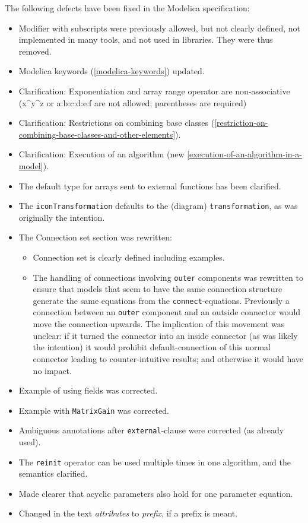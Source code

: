 The following defects have been fixed in the Modelica specification:
\begin{itemize}
\item
  Modifier with subscripts were previously allowed, but not clearly
  defined, not implemented in many tools, and not used in libraries.
  They were thus removed.
\item
  Modelica keywords (\cref{modelica-keywords}) updated.
\item
  Clarification: Exponentiation and array range operator are
  non-associative\\
  (x\^{}y\^{}z or a:b:c:d:e:f are not allowed; parentheses are required)
\item
  Clarification: Restrictions on combining base classes (\cref{restriction-on-combining-base-classes-and-other-elements}).
\item
  Clarification: Execution of an algorithm (new \cref{execution-of-an-algorithm-in-a-model}).
\item
  The default type for arrays sent to external functions has been
  clarified.
\item
  The \lstinline!iconTransformation! defaults to the (diagram)
  \lstinline!transformation!, as was originally the intention.
\item
  The Connection set section was rewritten:
  \begin{itemize}
  \item
    Connection set is clearly defined including examples.
  \item
    The handling of connections involving \lstinline!outer! components was rewritten to ensure that models that seem to have the same connection structure generate the same equations from the \lstinline!connect!-equations.
    Previously a connection between an \lstinline!outer! component and an outside connector would move the connection upwards.
    The implication of this movement was unclear: if it turned the connector into an inside connector (as was likely the intention) it would prohibit default-connection of this normal connector leading to counter-intuitive results; and otherwise it would have no impact.
  \end{itemize}
\item
  Example of using fields was corrected.
\item
  Example with \lstinline!MatrixGain! was corrected.
\item
  Ambiguous annotations after \lstinline!external!-clause were corrected (as already used).
\item
  The \lstinline!reinit! operator can be used multiple times in one algorithm, and the semantics clarified.
\item
  Made clearer that acyclic parameters also hold for one parameter
  equation.
\item
  Changed in the text \emph{attributes} to \emph{prefix}, if a prefix is
  meant.
\end{itemize}

